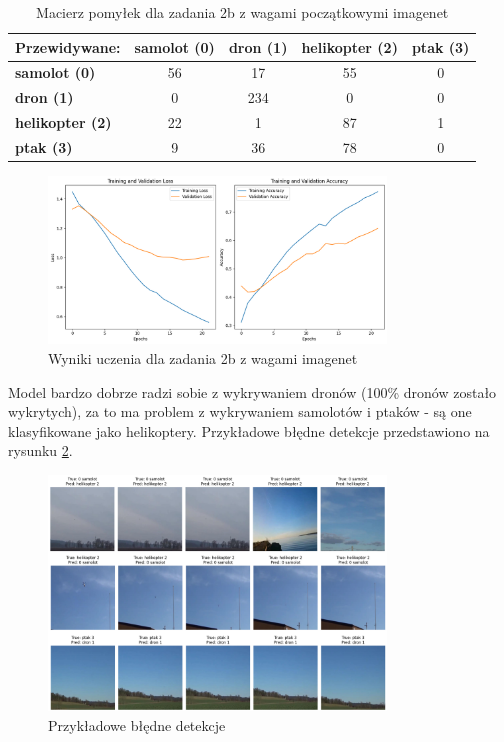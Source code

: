\begin{table}[ht]
\centering
\begin{tabular}{|l|c|c|c|c|}
\hline
Przewidywane: & \textbf{samolot (0)} & \textbf{dron (1)} & \textbf{helikopter (2)} & \textbf{ptak (3)} \\ \hline
\textbf{samolot (0)} & 56 & 17 & 55 & 0 \\ \hline
\textbf{dron (1)} & 0 & 234 & 0 & 0 \\ \hline
\textbf{helikopter (2)} & 22 & 1 & 87 & 1 \\ \hline
\textbf{ptak (3)} & 9 & 36 & 78 & 0 \\ \hline
\end{tabular}
\caption{Macierz pomyłek dla zadania 2b z wagami początkowymi imagenet}
\label{tab:z2b}
\end{table}
    
    
\begin{figure}[H]
    \centering
    \includegraphics[width=0.8\textwidth]{img/z2b_with_w.png}
    \caption{Wyniki uczenia dla zadania 2b z wagami imagenet}
    \label{fig:z2b_with_w}
\end{figure}

Model bardzo dobrze radzi sobie z wykrywaniem dronów (100\% dronów zostało wykrytych), za to ma problem z wykrywaniem samolotów i ptaków - są one klasyfikowane jako helikoptery. Przykładowe błędne detekcje przedstawiono na rysunku \ref{fig:z2b_imgs}.

\begin{figure}[H]
    \centering
    \includegraphics[width=0.8\textwidth]{img/z2b_imgs.png}
    \caption{Przykładowe błędne detekcje}
    \label{fig:z2b_imgs}
\end{figure}


